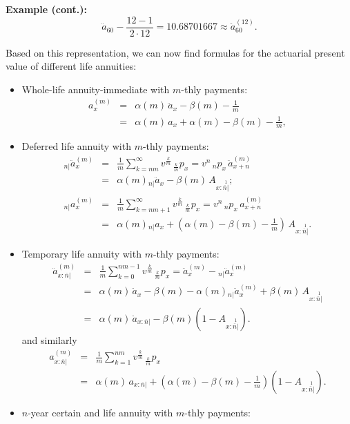 \documentclass[11pt,fleqn,oneside]{book}
\begin{document}
\noindent \textbf{Example (cont.):}
$$
\ddot{a}_{60} - \frac{12-1}{2\cdot 12} = 10.68701667 \approx \ddot{a}_{60}^{(12)}.
$$

Based on this representation, we can now find formulas for the actuarial present value of different life annuities:
\begin{itemize}
\item Whole-life annuity-immediate with $m$-thly payments:
\begin{eqnarray*}
a_x^{(m)} &=& \alpha(m)\, \ddot{a}_x - \beta(m) - \frac{1}{m} \\
&=& \alpha(m)\,a_x + \alpha(m) - \beta(m) - \frac{1}{m},
\end{eqnarray*}
\item Deferred life annuity with $m$-thly payments: 
\begin{eqnarray*}
{_{n|}\ddot{a}_x^{(m)}} &=& \frac{1}{m} \sum_{k=nm}^{\infty} v^{\frac{k}{m}}\,{_{\frac{k}{m}}p_x} = v^n\,{_np_x}\, \ddot{a}_{x+n}^{(m)}\\
&=& \alpha(m) {_{n|}\ddot{a}_x} - \beta(m)\,A_{x:\stackrel{1}{\overline{n}|}};\\
{_{n|}a_x^{(m)}} &=& \frac{1}{m} \sum_{k=nm+1}^{\infty} v^{\frac{k}{m}}\,{_{\frac{k}{m}}p_x} = v^n\,{_np_x}\, a_{x+n}^{(m)}\\
&=& \alpha(m) {_{n|}a_x} + \left(\alpha(m) - \beta(m) - \frac{1}{m}\right)\,A_{x:\stackrel{1}{\overline{n}|}}.
\end{eqnarray*}
\item Temporary life annuity with $m$-thly payments: 
\begin{eqnarray*}
{\ddot{a}_{x:\overline{n}|}^{(m)}} &=&  \frac{1}{m} \sum_{k=0}^{nm-1} v^{\frac{k}{m}}\,{_{\frac{k}{m}}p_x} = \ddot{a}_x^{(m)}  - {_{n|}\ddot{a}_x^{(m)}}\\
&=& \alpha(m) \, \ddot{a}_x - \beta(m) - \alpha(m) {_{n|}\ddot{a}_x^{(m)}} + \beta(m)\,A_{x:\stackrel{1}{\overline{n}|}}\\
&=& \alpha(m) \,\ddot{a}_{x:\overline{n}|} - \beta(m) \left(1- A_{x:\stackrel{1}{\overline{n}|}}\right).
\end{eqnarray*}
and similarly
\begin{eqnarray*}
 {a_{x:\overline{n}|}^{(m)}} &=&  \frac{1}{m} \sum_{k=1}^{nm} v^{\frac{k}{m}}\,{_{\frac{k}{m}}p_x}\\
&=& \alpha(m) \, a_{x:\overline{n}|} + \left(\alpha(m) -  \beta(m) - \frac{1}{m} \right) \left(1- A_{x:\stackrel{1}{\overline{n}|}}\right).
 \end{eqnarray*}
\item $n$-year certain and life annuity with $m$-thly payments:

\end{itemize}
\end{document}
